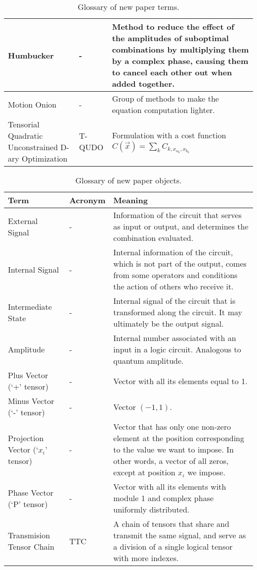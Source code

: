 \begin{table}[h]
\begin{tabular}{|p{4cm}|l|p{8cm}|}
         \hline
         Humbucker & - & Method to reduce the effect of the amplitudes of suboptimal combinations by multiplying them by a complex phase, causing them to cancel each other out when added together. \\
         \hline
         Motion Onion & -  & Group of methods to make the equation computation lighter. \\
         \hline
         Tensorial Quadratic Unconstrained D-ary Optimization & T-QUDO  & Formulation with a cost function $C(\vec{x})=\sum_{k} C_{k,x_{a_k},x_{b_k}}$ \\
         \hline
    \end{tabular}
    \caption{Glossary of new paper terms.}
    \label{tab: Glossary new}
\end{table}


\begin{table}[h]
    \centering
    \begin{tabular}{|p{4cm}|l|p{8cm}|}
         \hline
         Term & Acronym & Meaning \\
         \hline
         External Signal & - & Information of the circuit that serves as input or output, and determines the combination evaluated.\\
         \hline
         Internal Signal & - & Internal information of the circuit, which is not part of the output, comes from some operators and conditions the action of others who receive it.\\
         \hline
         Intermediate State & - & Internal signal of the circuit that is transformed along the circuit. It may ultimately be the output signal. \\
         \hline
         Amplitude & - & Internal number associated with an input in a logic circuit. Analogous to quantum amplitude. \\
         \hline
         Plus Vector (`+' tensor) & - & Vector with all its elements equal to 1.\\
         \hline
         Minus Vector (`-' tensor) & - & Vector $(-1,1)$.\\
         \hline
         Projection Vector (`$x_i$' tensor) & - & Vector that has only one non-zero element at the position corresponding to the value we want to impose. In other words, a vector of all zeros, except at position $x_i$ we impose.\\
         \hline
         Phase Vector (`P' tensor) & - & Vector with all its elements with module 1 and complex phase uniformly distributed.\\
         \hline
         Transmision Tensor Chain & TTC & A chain of tensors that share and transmit the same signal, and serve as a division of a single logical tensor with more indexes.\\
         \hline
    \end{tabular}
    \caption{Glossary of new paper objects.}
    \label{tab: Glossary new objects}
\end{table}




